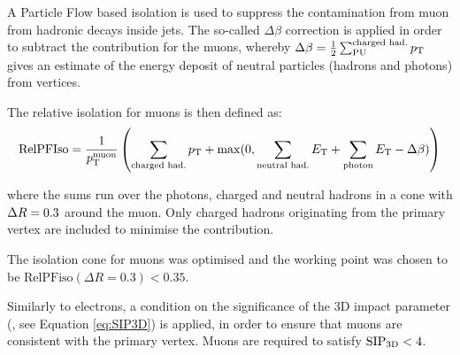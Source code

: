 A Particle Flow based isolation is used to suppress the contamination from muon from hadronic decays inside jets.
The so-called $\Delta\beta$ correction is applied in order to subtract the \pileup{} contribution for the muons, 
whereby $\Delta\beta = \frac{1}{2} \sum^\text{charged had.}_\text{PU} p_{\mathrm{T}}$
gives an estimate of the energy deposit of neutral particles (hadrons and photons) from \pileup{} vertices.

The relative isolation for muons is then defined as:
\begin{equation}
\text{RelPFIso} = \frac{1}{p_{\mathrm{T}}^\text{muon}} \left( \sum_\text{charged had.} p_{\mathrm{T}} + \max(0, \sum_\text{neutral had.} E_{\mathrm{T}} + \sum_\text{photon} E_{\mathrm{T}} - \Delta \beta) \right)
\label{eqn:mupfiso}
\end{equation}

where the sums run over the photons, charged and neutral hadrons in a cone with $\Delta R = 0.3$ around the muon.
Only charged hadrons originating from the primary vertex are included to minimise the \pileup{} contribution.

The isolation cone for muons was optimised and the working point was chosen to be $\text{RelPFiso}(\Delta R = 0.3) < 0.35$. 

Similarly to electrons, a condition on the significance of the 3D impact parameter (\SIPthreeD, see Equation \ref{eq:SIP3D}) is applied,
in order to ensure that muons are consistent with the primary vertex.
Muons are required to satisfy $\mathrm{SIP}_{\mathrm{3D}} < 4$.
